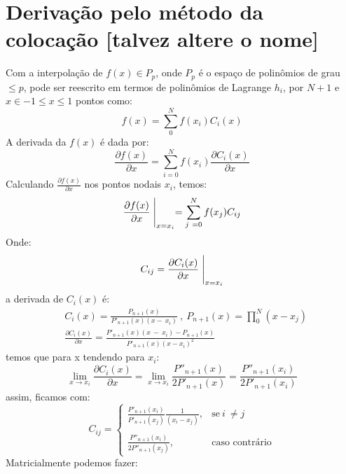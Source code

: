 \section{Derivação pelo método da colocação [talvez altere o nome] }
 Com a interpolação de $f(x) \in P_p$, onde $P_p$ é o espaço de polinômios de grau $\leq p$, pode ser reescrito em termos de polinômios de Lagrange $h_i$, por $N + 1$ e $x \in -1 \leq x \leq 1$ pontos como:
 \begin{equation}
 f(x)  = \sum^{N}_{0} f(x_i) C_i(x)
 \end{equation}
 A derivada da $f(x)$ é dada por:
 \begin{equation}
 \frac{\partial f(x)}{\partial x} = \sum^{N}_{i = 0} f(x_i) \frac{\partial C_i(x)}{\partial x}
 \end{equation}
 Calculando $\frac{\partial f(x)}{\partial x}$ nos pontos nodais $x_i$, temos:
\begin{equation}
   \frac{\partial f(x)}{\partial x}  \Biggm\lvert_{x=x_i} = \sum^{N}_{j\ = 0} f(x_j) C_{ij}
\end{equation}
 Onde:
 \begin{equation}
  C_{ij} = \frac{\partial C_i(x)}{\partial x} \Biggm\lvert_{x=x_i}
 \end{equation}
 a derivada de $C_i(x)$ é:
 \begin{align}
 &C_i(x) = \frac{P_{n+1}(x)}{P'_{n+1}(x)(x -\ x_i)}\ ,\ P_{n+1}(x) = \prod^{N}_{0} (x - x_j)\\
 &\frac{\partial C_i(x)}{\partial x} =  \frac{P'_{n+1}(x)(x\ -\ x_i) - P_{n+1}(x)}{P'_{n+1}(x)(x - x_i)^2}\ 
 \end{align}
 temos que para x tendendo para $x_i$:
 \begin{equation}
 \lim_{x \rightarrow x_i}  \frac{\partial C_i(x)}{\partial x} =  \lim_{x \rightarrow x_i} \frac{P''_{n+1}(x)}{2P'_{n+1}(x)} = \frac{P''_{n+1}(x_i)}{2P'_{n+1}(x_i)}
 \end{equation}
 assim, ficamos com:
 \begin{equation}\label{eq:test}
 C_{ij}= 
\begin{cases}
    \frac{P'_{n+1}(x_i)}{P'_{n+1}(x_j)} \frac{1}{(x_i - x_j)},& \text{se}\ i\ \neq  j\\\\
    \frac{P''_{n+1}(x_i)}{2P''_{n+1}(x_j)},              & \text{caso contrário}
\end{cases}
 \end{equation}
 Matricialmente podemos fazer:
